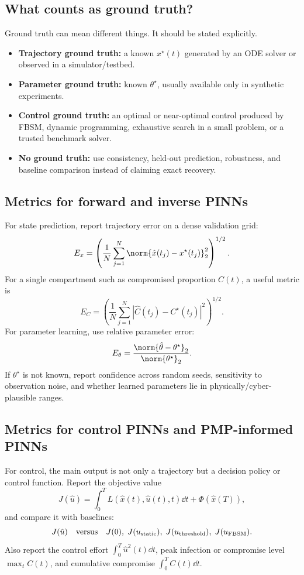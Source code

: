 \documentclass[11pt,a4paper]{article}
\begin{document}
\subsection{What counts as ground truth?}
Ground truth can mean different things. It should be stated explicitly.
\begin{itemize}[leftmargin=2em]
    \item \textbf{Trajectory ground truth:} a known $x^\star(t)$ generated by an ODE solver or observed in a simulator/testbed.
    \item \textbf{Parameter ground truth:} known $\theta^\star$, usually available only in synthetic experiments.
    \item \textbf{Control ground truth:} an optimal or near-optimal control produced by FBSM, dynamic programming, exhaustive search in a small problem, or a trusted benchmark solver.
    \item \textbf{No ground truth:} use consistency, held-out prediction, robustness, and baseline comparison instead of claiming exact recovery.
\end{itemize}

\subsection{Metrics for forward and inverse PINNs}
For state prediction, report trajectory error on a dense validation grid:
\begin{equation}
    E_x=\left(\frac{1}{N}\sum_{j=1}^N \norm{\hat{x}(t_j)-x^{\star}(t_j)}_2^2\right)^{1/2}.
\end{equation}
For a single compartment such as compromised proportion $C(t)$, a useful metric is
\begin{equation}
    E_C=\left(\frac{1}{N}\sum_{j=1}^N |\hat{C}(t_j)-C^{\star}(t_j)|^2\right)^{1/2}.
\end{equation}
For parameter learning, use relative parameter error:
\begin{equation}
    E_\theta=\frac{\norm{\hat{\theta}-\theta^\star}_2}{\norm{\theta^\star}_2}.
\end{equation}
If $\theta^\star$ is not known, report confidence across random seeds, sensitivity to observation noise, and whether learned parameters lie in physically/cyber-plausible ranges.

\subsection{Metrics for control PINNs and PMP-informed PINNs}
For control, the main output is not only a trajectory but a decision policy or control function. Report the objective value
\begin{equation}
    J(\hat{u})=\int_0^T L(\hat{x}(t),\hat{u}(t),t)\dd t+\Phi(\hat{x}(T)),
\end{equation}
and compare it with baselines:
\begin{equation}
    J(\hat{u}) \quad \text{versus} \quad J(0),\; J(u_{\rm static}),\; J(u_{\rm threshold}),\; J(u_{\rm FBSM}).
\end{equation}
Also report the control effort $\int_0^T \hat{u}^2(t)\dd t$, peak infection or compromise level $\max_t C(t)$, and cumulative compromise $\int_0^T C(t)\dd t$.
\end{document}
